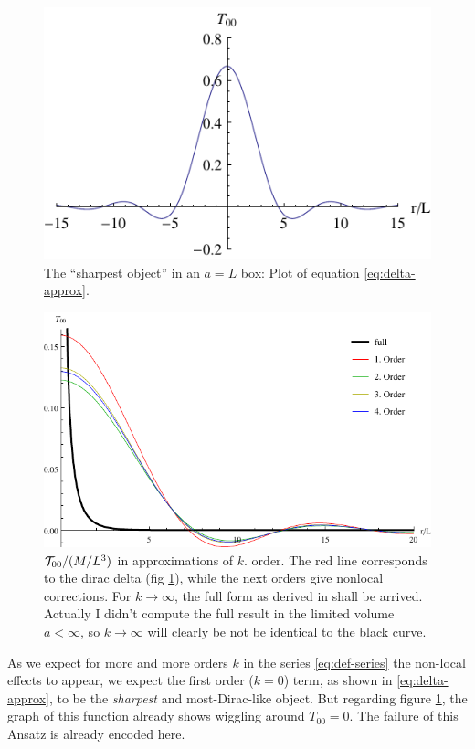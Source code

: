 \documentclass[10pt,a4paper]{article}
\begin{document}
\begin{figure}
\includegraphics[scale=1]{figures/delta-box.pdf}
\caption{The ``sharpest object'' in an $a=L$ box: Plot of equation \eqref{eq:delta-approx}.}\label{fig:delta}
\end{figure}

\begin{figure}[h!]
\includegraphics[scale=1]{figures/t00-regularized.pdf}
\caption{${\cal T}_{00}/(M/L^3)$ in approximations of $k$. order. The red line corresponds to the dirac delta (fig \ref{fig:delta}), while the next orders give nonlocal corrections. For $k\to \infty$, the full form as derived in \cite{isi2013} shall be arrived. Actually I didn't compute the full result in the limited volume $a<\infty$, so $k\to\infty$ will clearly be not be identical to the black curve.}\label{fig:T00-regularized}
\end{figure}
%
As we expect for more and more orders $k$ in the series \eqref{eq:def-series} the non-local effects to appear, we expect the first order ($k=0$) term, as shown in \eqref{eq:delta-approx}, to be the \emph{sharpest} and most-Dirac-like object. But regarding figure \ref{fig:delta}, the graph of this function already shows wiggling around $T_{00}=0$. The failure of this Ansatz is already encoded here.
\end{document}
